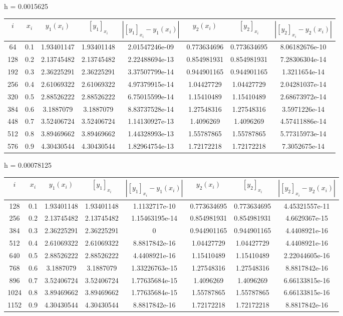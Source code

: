 \documentclass[11pt]{article}
\begin{document}
h = 0.0015625 \\ 
\begin{tabular}{c | c c c c c c c}
$i$ & $x_i$ & $y_1(x_i)$ & $[y_1]_{x_i}$ & $|[y_1]_{x_i} - y_1(x_i)|$ & $y_2(x_i)$ & $[y_2]_{x_i}$ & $|[y_2]_{x_i} - y_2(x_i)|$ \\ \hline
64 & 0.1 & 1.93401147 & 1.93401148 & 2.01547246e-09 & 0.773634696 & 0.773634695 & 8.06182676e-10 \\
128 & 0.2 & 2.13745482 & 2.13745482 & 2.22488694e-13 & 0.854981931 & 0.854981931 & 7.28306304e-14 \\
192 & 0.3 & 2.36225291 & 2.36225291 & 3.37507799e-14 & 0.944901165 & 0.944901165 & 1.3211654e-14 \\
256 & 0.4 & 2.61069322 & 2.61069322 & 4.97379915e-14 & 1.04427729 & 1.04427729 & 2.04281037e-14 \\
320 & 0.5 & 2.88526222 & 2.88526222 & 6.75015599e-14 & 1.15410489 & 1.15410489 & 2.68673972e-14 \\
384 & 0.6 & 3.1887079 & 3.1887079 & 8.83737528e-14 & 1.27548316 & 1.27548316 & 3.5971226e-14 \\
448 & 0.7 & 3.52406724 & 3.52406724 & 1.14130927e-13 & 1.4096269 & 1.4096269 & 4.57411886e-14 \\
512 & 0.8 & 3.89469662 & 3.89469662 & 1.44328993e-13 & 1.55787865 & 1.55787865 & 5.77315973e-14 \\
576 & 0.9 & 4.30430544 & 4.30430544 & 1.82964754e-13 & 1.72172218 & 1.72172218 & 7.3052675e-14 \\
\end{tabular}

h = 0.00078125 \\ 
\begin{tabular}{c | c c c c c c c}
$i$ & $x_i$ & $y_1(x_i)$ & $[y_1]_{x_i}$ & $|[y_1]_{x_i} - y_1(x_i)|$ & $y_2(x_i)$ & $[y_2]_{x_i}$ & $|[y_2]_{x_i} - y_2(x_i)|$ \\ \hline
128 & 0.1 & 1.93401148 & 1.93401148 & 1.1132717e-10 & 0.773634695 & 0.773634695 & 4.45321557e-11 \\
256 & 0.2 & 2.13745482 & 2.13745482 & 1.15463195e-14 & 0.854981931 & 0.854981931 & 4.6629367e-15 \\
384 & 0.3 & 2.36225291 & 2.36225291 & 0 & 0.944901165 & 0.944901165 & 4.4408921e-16 \\
512 & 0.4 & 2.61069322 & 2.61069322 & 8.8817842e-16 & 1.04427729 & 1.04427729 & 4.4408921e-16 \\
640 & 0.5 & 2.88526222 & 2.88526222 & 4.4408921e-16 & 1.15410489 & 1.15410489 & 2.22044605e-16 \\
768 & 0.6 & 3.1887079 & 3.1887079 & 1.33226763e-15 & 1.27548316 & 1.27548316 & 8.8817842e-16 \\
896 & 0.7 & 3.52406724 & 3.52406724 & 1.77635684e-15 & 1.4096269 & 1.4096269 & 6.66133815e-16 \\
1024 & 0.8 & 3.89469662 & 3.89469662 & 1.77635684e-15 & 1.55787865 & 1.55787865 & 6.66133815e-16 \\
1152 & 0.9 & 4.30430544 & 4.30430544 & 8.8817842e-16 & 1.72172218 & 1.72172218 & 8.8817842e-16 \\
\end{tabular}
\end{document}
